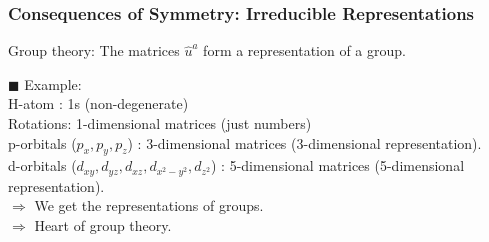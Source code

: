 \documentclass[a4paper, 12pt]{article}
\begin{document}
\subsubsection{Consequences of Symmetry: Irreducible Representations}
Group theory: The matrices $\hat{u}^a$ form a representation of a group. 

 $\blacksquare$ Example: \\
\tab \tab H-atom : 1s (non-degenerate)\\
\tab \tab Rotations: 1-dimensional matrices (just numbers)\\
\tab  p-orbitals ($p_x, p_y, p_z$) : 3-dimensional matrices (3-dimensional representation).\\
\tab  d-orbitals ($d_{xy}, d_{yz}, d_{xz}, d_{x^2-y^2},d_{z^2}$) : 5-dimensional matrices (5-dimensional representation).\\
\tab  $\Rightarrow$ We get the representations of groups.\\
\tab  $\Rightarrow$ Heart of group theory.
\end{document}
